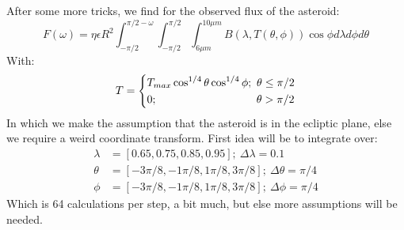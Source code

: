 \documentclass[a4paper,10pt]{article}
\begin{document}
After some more tricks, we find for the observed flux of the asteroid:
\begin{equation}
 F(\omega) = \eta \epsilon R^2 \int_{- \pi / 2}^{\pi / 2 - \omega} \int_{- \pi / 2}^{\pi / 2} \int _{6\mu m}^{10\mu m} B\left( \lambda, T(\theta, \phi)\right)\cos \phi d \lambda d \phi d \theta
\end{equation}
With:
\begin{equation}
 T = \begin{dcases}T_{max}\cos ^{1/4} \theta \cos ^{1/4} \phi; ~ \theta \leq \pi / 2 \\ 0; ~~~~~~~~~~~~~~~~~~~~~~~~~~~ \theta > \pi / 2 \end{dcases}
\end{equation}
In which we make the assumption that the asteroid is in the ecliptic plane, else we require a weird coordinate transform. First idea will be to integrate over:
\begin{align}
 \lambda &= [0.65, 0.75, 0.85, 0.95];~ \Delta \lambda = 0.1 \\
 \theta &= [-3\pi/8, -1\pi/8, 1\pi/8, 3\pi/8];~ \Delta \theta = \pi/4 \\
 \phi &= [-3\pi/8, -1\pi/8, 1\pi/8, 3\pi/8];~ \Delta \phi = \pi/4
\end{align}
Which is 64 calculations per step, a bit much, but else more assumptions will be needed.
\end{document}
